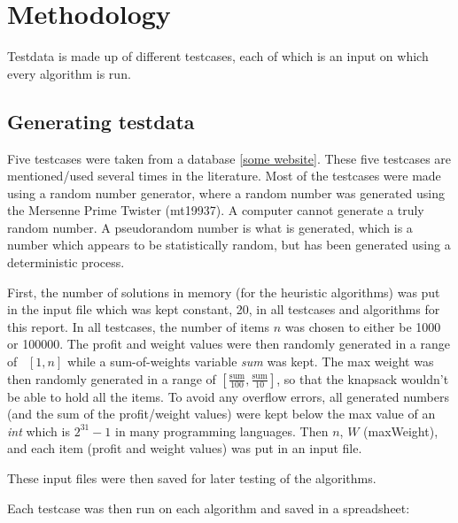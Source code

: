 \documentclass[titlepage]{article}
\begin{document}
\section{Methodology}

Testdata is made up of different testcases, each of which is an input on which every algorithm is run.

\subsection{Generating testdata}

Five testcases were taken from a database \ref{some website}. These five testcases are mentioned/used several times in the literature.  Most of the testcases were made using a random number generator, where a random number was generated using the Mersenne Prime Twister (mt19937). A computer cannot generate a truly random number. A pseudorandom number is what is generated, which is a number which appears to be statistically random, but has been generated using a deterministic process. 

First, the number of solutions in memory (for the heuristic algorithms) was put in the input file which was kept constant, 20, in all testcases and algorithms for this report. In all testcases, the number of items $n$ was chosen to either be 1000 or 100000. The profit and weight values were then randomly generated in a range of \, $ [1, n] $ while a sum-of-weights variable \emph{sum} was kept. The max weight was then randomly generated in a range of $[\frac{\text{sum}}{100} , \frac{\text{sum}}{10}]$, so that the knapsack wouldn't be able to hold all the items. To avoid any overflow errors, all generated numbers (and the sum of the profit/weight values) were kept below the max value of an \emph{int} which is $2^{31}-1$ in many programming languages.  Then $n$, $W$ (maxWeight), and each item (profit and weight values) was put in an input file. 

These input files were then saved for later testing of the algorithms. 

Each testcase was then run on each algorithm and saved in a spreadsheet:



 
\end{document}
